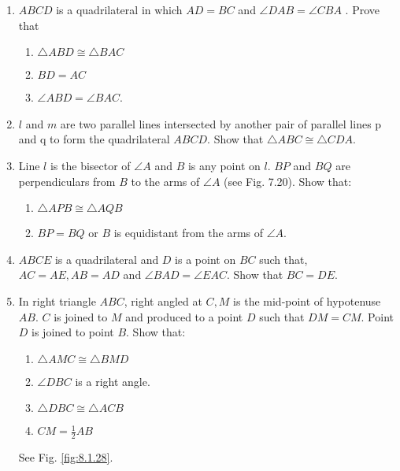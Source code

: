 \begin{enumerate}[label=\arabic*.,ref=\thesubsection.\theenumi]
%
\item $ABCD$ is a quadrilateral in which $AD = BC$ and $\angle  DAB = \angle  CBA$ . Prove that
\begin{enumerate}
\item  $\triangle  ABD \cong  \triangle  BAC $
\item $ BD = AC $
\item  $\angle  ABD = \angle  BAC$.
\end{enumerate}
%
\item $l$ and $m$ are two parallel lines intersected by another pair of parallel lines p and q 
to form the quadrilateral $ABCD$. Show that $\triangle  ABC \cong  \triangle  CDA$.
%
\item Line $l$ is the bisector of $ \angle  A$ and $B$ is any point on $l$. $BP$ and $BQ$ are perpendiculars from $B$ to the arms of $\angle  A$ (see Fig. 7.20). Show that: 
\begin{enumerate}
\item  $\triangle  APB \cong  \triangle  AQB$ 
\item  $BP = BQ$ or $B$ is equidistant from the arms of $\angle  A$.
\end{enumerate}
%
\item $ABCE$ is a quadrilateral and $D$ is a point on $BC$ such that, $AC = AE, AB = AD$ and $\angle  BAD = \angle  EAC$. Show that $BC = DE$.
%
\item In right triangle $ABC$, right angled at $C, M$ is the mid-point of hypotenuse $AB$. $C$ is joined to $M$ and produced to a point $D$ such that $DM = CM$. Point $D$ is joined to point $B$.
Show that: 
\begin{enumerate}
\item $ \triangle  AMC \cong  \triangle  BMD $
\item $\angle  DBC$ is a right angle. 
\item $\triangle  DBC \cong  \triangle  ACB$
\item $ CM = \frac{1}{ 2} AB$
\end{enumerate}
%
See  Fig. \ref{fig:8.1.28}.
\begin{enumerate}


\end{enumerate}


\end{enumerate}
